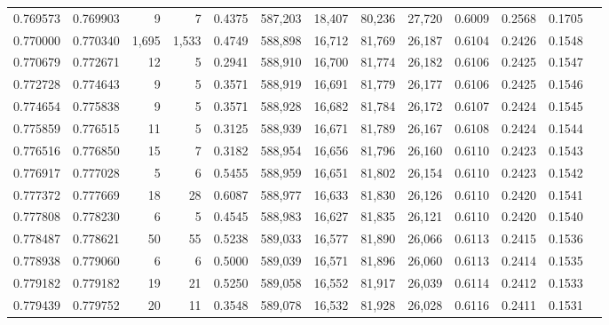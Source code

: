 \begin{tabular}{rrrrrrrrrrrrr}
0.769573 & 0.769903 &      9 &     7 &                                     0.4375 & 587,203 &  18,407 &  80,236 &  27,720 & 0.6009 & 0.2568 & 0.1705 \\
0.770000 & 0.770340 &  1,695 & 1,533 &                                     0.4749 & 588,898 &  16,712 &  81,769 &  26,187 & 0.6104 & 0.2426 & 0.1548 \\
0.770679 & 0.772671 &     12 &     5 &                                     0.2941 & 588,910 &  16,700 &  81,774 &  26,182 & 0.6106 & 0.2425 & 0.1547 \\
0.772728 & 0.774643 &      9 &     5 &                                     0.3571 & 588,919 &  16,691 &  81,779 &  26,177 & 0.6106 & 0.2425 & 0.1546 \\
0.774654 & 0.775838 &      9 &     5 &                                     0.3571 & 588,928 &  16,682 &  81,784 &  26,172 & 0.6107 & 0.2424 & 0.1545 \\
0.775859 & 0.776515 &     11 &     5 &                                     0.3125 & 588,939 &  16,671 &  81,789 &  26,167 & 0.6108 & 0.2424 & 0.1544 \\
0.776516 & 0.776850 &     15 &     7 &                                     0.3182 & 588,954 &  16,656 &  81,796 &  26,160 & 0.6110 & 0.2423 & 0.1543 \\
0.776917 & 0.777028 &      5 &     6 &                                     0.5455 & 588,959 &  16,651 &  81,802 &  26,154 & 0.6110 & 0.2423 & 0.1542 \\
0.777372 & 0.777669 &     18 &    28 &                                     0.6087 & 588,977 &  16,633 &  81,830 &  26,126 & 0.6110 & 0.2420 & 0.1541 \\
0.777808 & 0.778230 &      6 &     5 &                                     0.4545 & 588,983 &  16,627 &  81,835 &  26,121 & 0.6110 & 0.2420 & 0.1540 \\
0.778487 & 0.778621 &     50 &    55 &                                     0.5238 & 589,033 &  16,577 &  81,890 &  26,066 & 0.6113 & 0.2415 & 0.1536 \\
0.778938 & 0.779060 &      6 &     6 &                                     0.5000 & 589,039 &  16,571 &  81,896 &  26,060 & 0.6113 & 0.2414 & 0.1535 \\
0.779182 & 0.779182 &     19 &    21 &                                     0.5250 & 589,058 &  16,552 &  81,917 &  26,039 & 0.6114 & 0.2412 & 0.1533 \\
0.779439 & 0.779752 &     20 &    11 &                                     0.3548 & 589,078 &  16,532 &  81,928 &  26,028 & 0.6116 & 0.2411 & 0.1531 \\

\end{tabular}
